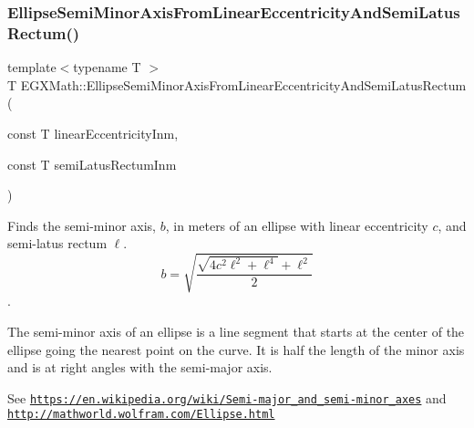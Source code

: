 \mbox{\label{group___e_g_x_math-_geometry-2_d-_ellipse-_semi_minor_axis_gac4b0e45f43bee20fc64bbdd421ebc956}} 
\subsubsection{\texorpdfstring{Ellipse\+Semi\+Minor\+Axis\+From\+Linear\+Eccentricity\+And\+Semi\+Latus\+Rectum()}{EllipseSemiMinorAxisFromLinearEccentricityAndSemiLatusRectum()}}
{\footnotesize\ttfamily template$<$typename T $>$ \\
T E\+G\+X\+Math\+::\+Ellipse\+Semi\+Minor\+Axis\+From\+Linear\+Eccentricity\+And\+Semi\+Latus\+Rectum (\begin{DoxyParamCaption}\item[{const T}]{linear\+Eccentricity\+Inm,  }\item[{const T}]{semi\+Latus\+Rectum\+Inm }\end{DoxyParamCaption})}



Finds the semi-\/minor axis, $b$, in meters of an ellipse with linear eccentricity $c$, and semi-\/latus rectum $\ell$. \[ b=\sqrt{\dfrac{\sqrt{4 c^2 \ell^2+ \ell^4}+\ell^2}{2}}\]. 

The semi-\/minor axis of an ellipse is a line segment that starts at the center of the ellipse going the nearest point on the curve. It is half the length of the minor axis and is at right angles with the semi-\/major axis.

See \href{https://en.wikipedia.org/wiki/Semi-major_and_semi-minor_axes}{\tt https\+://en.\+wikipedia.\+org/wiki/\+Semi-\/major\+\_\+and\+\_\+semi-\/minor\+\_\+axes} and \href{http://mathworld.wolfram.com/Ellipse.html}{\tt http\+://mathworld.\+wolfram.\+com/\+Ellipse.\+html}


